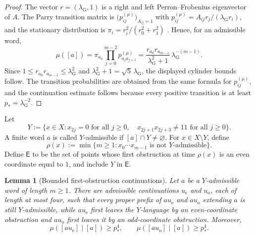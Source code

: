 \documentclass{etds}%
\numberwithin{equation}{section}
\theoremstyle{plain}
\newtheorem{lemma}[theorem]{Lemma}
\theoremstyle{definition}
\theoremstyle{remark}
\begin{document}
\begin{proof}
The vector $r=(\lambda_{\mathrm G},1)$ is a right and left Perron--Frobenius eigenvector
of $A$.  The Parry transition matrix is
$\bigl(p_{ij}^{(\mu)}\bigr)_{A_{ij}=1}$ with
$p_{ij}^{(\mu)}=A_{ij}r_j/(\lambda_{\mathrm G} r_i)$, and the stationary distribution is
$\pi_i=r_i^2/(r_0^2+r_1^2)$ \cite{Parry1964}.  Hence, for an admissible word,
\[
\mu([a])=\pi_{a_0}\prod_{j=0}^{m-2}p_{a_j a_{j+1}}^{(\mu)}
=\frac{r_{a_0}r_{a_{m-1}}}{\lambda_{\mathrm G}^2+1}\,\lambda_{\mathrm G}^{-(m-1)}.
\]
Since $1\le r_{a_0}r_{a_{m-1}}\le\lambda_{\mathrm G}^2$ and
$\lambda_{\mathrm G}^2+1=\sqrt{5}\,\lambda_{\mathrm G}$, the displayed cylinder bounds follow.  The
transition probabilities are obtained from the same formula for $p_{ij}^{(\mu)}$, and
the continuation estimate follows because every positive transition is at
least $p_*=\lambda_{\mathrm G}^{-2}$.
\end{proof}

Let
\[
Y:=\{x\in X:x_{2j}=0\text{ for all }j\ge 0,\quad
x_{2j+1}x_{2j+3}\ne 11\text{ for all }j\ge 0\}.
\]
A finite word $a$ is called $Y$-admissible if $[a]\cap Y\ne\varnothing$.  For
$x\in X\setminus Y$, define
\[
\rho(x):=\min\{m\ge 1:x_0\cdots x_{m-1}\text{ is not }Y\text{-admissible}\}.
\]
Define $\mathsf{E}$ to be the set of points whose first obstruction at time
$\rho(x)$ is an even coordinate equal to $1$, and include $Y$ in $\mathsf{E}$.

\begin{lemma}[Bounded first-obstruction continuations]
\label{lem:golden-bounded-continuations}
Let $a$ be a $Y$-admissible word of length $m\ge 1$.  There are admissible
continuations $u_{\mathrm e}$ and $u_{\mathrm o}$, each of length at most four,
such that every proper prefix of $au_{\mathrm e}$ and $au_{\mathrm o}$ extending
$a$ is still $Y$-admissible, while $au_{\mathrm e}$ first leaves the
$Y$-language by an even-coordinate obstruction and $au_{\mathrm o}$ first
leaves it by an odd-coordinate obstruction.  Moreover,
\[
\mu([au_{\mathrm e}]\mid[a])\ge p_*^4,\qquad
\mu([au_{\mathrm o}]\mid[a])\ge p_*^4.
\]
\end{lemma}
\end{document}
